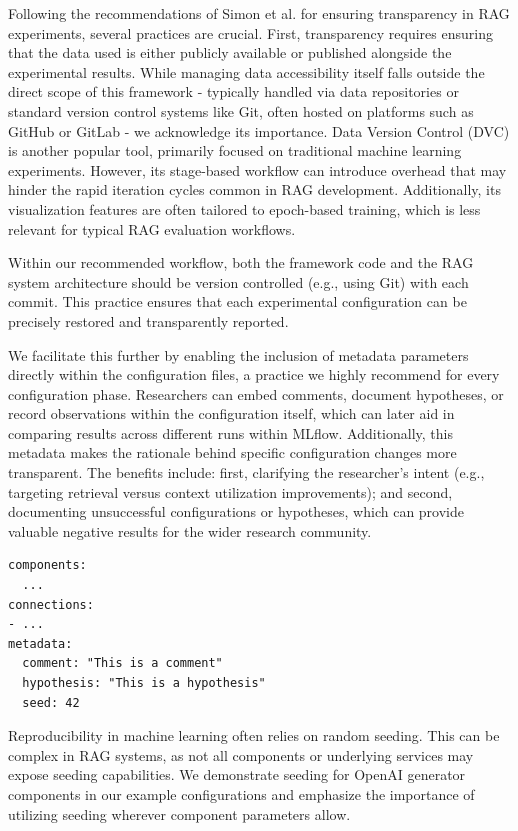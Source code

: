 Following the recommendations of Simon et al. \cite{Simon.10112024} for ensuring transparency in RAG experiments, several practices are crucial. First, transparency requires ensuring that the data used is either publicly available or published alongside the experimental results. While managing data accessibility itself falls outside the direct scope of this framework - typically handled via data repositories or standard version control systems like Git, often hosted on platforms such as GitHub \cite{github-inc-2025} or GitLab \cite{gitlab-inc-2025} - we acknowledge its importance. Data Version Control (DVC) \cite{dvc.17.03.2025} is another popular tool, primarily focused on traditional machine learning experiments. However, its stage-based workflow can introduce overhead that may hinder the rapid iteration cycles common in RAG development. Additionally, its visualization features are often tailored to epoch-based training, which is less relevant for typical RAG evaluation workflows.

Within our recommended workflow, both the framework code and the RAG system architecture should be version controlled (e.g., using Git) with each commit. This practice ensures that each experimental configuration can be precisely restored and transparently reported.

We facilitate this further by enabling the inclusion of metadata parameters directly within the configuration files, a practice we highly recommend for every configuration phase. Researchers can embed comments, document hypotheses, or record observations within the configuration itself, which can later aid in comparing results across different runs within MLflow. Additionally, this metadata makes the rationale behind specific configuration changes more transparent. The benefits include: first, clarifying the researcher's intent (e.g., targeting retrieval versus context utilization improvements); and second, documenting unsuccessful configurations or hypotheses, which can provide valuable negative results for the wider research community.

\begin{verbatim}
components:
  ...
connections:
- ...
metadata: 
  comment: "This is a comment"
  hypothesis: "This is a hypothesis"
  seed: 42
\end{verbatim}

Reproducibility in machine learning often relies on random seeding. This can be complex in RAG systems, as not all components or underlying services may expose seeding capabilities. We demonstrate seeding for OpenAI generator components in our example configurations and emphasize the importance of utilizing seeding wherever component parameters allow.

